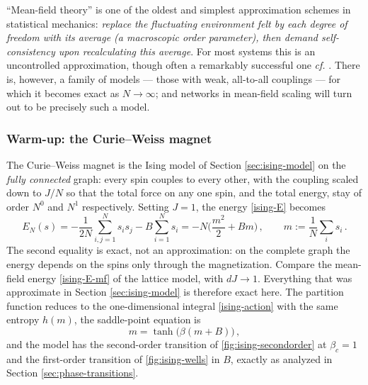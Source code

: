 \documentclass[11pt]{article}
\newcommand{\expval}[1]{\left\langle #1 \right\rangle}
\begin{document}
``Mean-field theory'' is one of the oldest and simplest approximation schemes in statistical mechanics: \emph{replace the fluctuating environment felt by each degree of freedom with its average (a macroscopic order parameter), then demand self-consistency upon recalculating this average}. For most systems this is an uncontrolled approximation, though often a remarkably successful one \emph{cf.} \cite[Chapter 1]{TongSFT}. There is, however, a family of models --- those with weak, all-to-all couplings --- for which it becomes exact as $N\to\infty$; and networks in mean-field scaling will turn out to be precisely such a model.




\subsubsection{Warm-up: the Curie--Weiss magnet}

The Curie--Weiss magnet is the Ising model of Section \ref{sec:ising-model} on the \emph{fully connected} graph: every spin couples to every other, with the coupling scaled down to $J/N$ so that the total force on any one spin, and the total energy, stay of order $N^0$ and $N^1$ respectively. Setting $J=1$, the energy \eqref{ising-E} becomes
%
\begin{equation} \label{cw-H}
    E_N(s) = -\frac{1}{2N}\sum_{i,j=1}^N s_i s_j - B \sum_{i=1}^N s_i = -N\Big(\frac{m^2}{2}+Bm\Big)\,,\qquad m := \frac{1}{N}\sum_i s_i\,.
\end{equation}
%
The second equality is exact, not an approximation: on the complete graph the energy depends on the spins only through the magnetization. Compare the mean-field energy \eqref{ising-E-mf} of the lattice model, with $dJ\to 1$. Everything that was approximate in Section \ref{sec:ising-model} is therefore exact here. The partition function reduces to the one-dimensional integral \eqref{ising-action} with the same entropy $h(m)$, the saddle-point equation is
%
\begin{equation} \label{cw-sc}
    m = \tanh\big(\beta(m+B)\big)\,,
\end{equation}
%
and the model has the second-order transition of \cref{fig:ising-secondorder} at $\beta_c = 1$ and the first-order transition of \cref{fig:ising-wells} in $B$, exactly as analyzed in Section \ref{sec:phase-transitions}.
\end{document}
